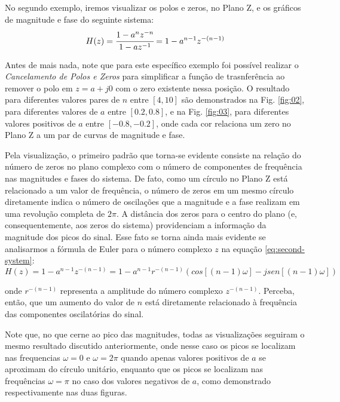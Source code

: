 \documentclass[a4paper,11pt]{article}
\numberwithin{figure}{section}
\numberwithin{equation}{section}
\numberwithin{table}{section}
\theoremstyle{definition}
\begin{document}
No segundo exemplo, iremos visualizar os polos e zeros, no Plano Z, e os gr\'aficos de magnitude e fase do seguinte sistema:
\begin{equation} \label{eq:second-system}
	H(z) = \cfrac{1 - a^nz^{-n}}{1-a z^{-1}} = 1 - a^{n-1}z^{-(n-1)}
\end{equation}

Antes de mais nada, note que para este espec\'ifico exemplo foi poss\'ivel realizar o \textit{Cancelamento de Polos e Zeros} para simplificar a funç\~ao de trasnfer\^encia ao remover o polo em $z = a + j0$ com o zero existente nessa posiç\~ao. O resultado para diferentes valores pares de $n$ entre $[4, 10]$ s\~ao demonstrados na Fig. \ref{fig:02}, para diferentes valores de $a$ entre $[0.2, 0.8]$, e na Fig. \ref{fig:03}, para diferentes valores positivos de $a$ entre $[-0.8, -0.2]$, onde cada cor relaciona um zero no Plano Z a um par de curvas de magnitude e fase.

Pela visualizaç\~ao, o primeiro padr\~ao que torna-se evidente consiste na relaç\~ao do n\'umero de zeros no plano complexo com o n\'umero de componentes de frequ\^encia nas magnitudes e fases do sistema. De fato, como um c\'irculo no Plano Z est\'a relacionado a um valor de frequ\^encia, o n\'umero de zeros em um mesmo c\'irculo diretamente indica o n\'umero de oscilaç\~oes que a magnitude e a fase realizam em uma revoluç\~ao completa de $2\pi$. A dist\^ancia dos zeros para o centro do plano (e, consequentemente, aos zeros do sistema) providenciam a informaç\~ao da magnitude dos picos do sinal. Esse fato se torna ainda mais evidente se analisarmos a f\'ormula de Euler para o n\'umero complexo $z$ na equaç\~ao \eqref{eq:second-system}:
\begin{equation} \label{eq:third-system}
	H(z) = 1 - a^{n-1}z^{-(n-1)} = 1 - a^{n-1} r^{-(n-1)} \left( cos[(n-1) \omega] - j sen[(n-1) \omega] \right)
\end{equation}

\noindent onde $r^{-(n-1)}$ representa a amplitude do n\'umero complexo $z^{-(n-1)}$. Perceba, ent\~ao, que um aumento do valor de $n$ est\'a diretamente relacionado \`a frequ\^encia das componentes oscilat\'orias do sinal.

Note que, no que cerne ao pico das magnitudes, todas as visualizaç\~oes seguiram o mesmo resultado discutido anteriormente, onde nesse caso os picos se localizam nas frequencias $\omega = 0$ e $\omega = 2\pi$ quando apenas valores positivos de $a$ se aproximam do c\'irculo unit\'ario, enquanto que os picos se localizam nas frequ\^encias $\omega = \pi$ no caso dos valores negativos de $a$, como demonstrado respectivamente nas duas figuras.
\end{document}
